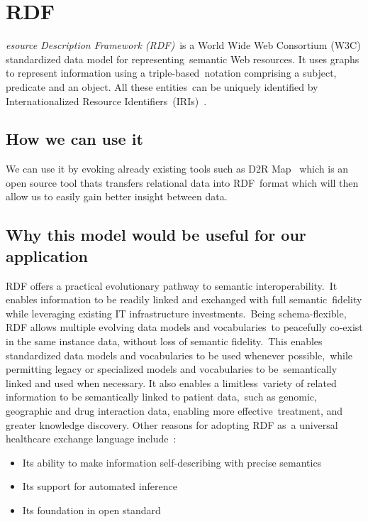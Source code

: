   \section[Resource Description Framework (RDF)]{RDF}
  \label{sec:rdf}

  \textit{esource Description Framework (RDF)}\
  is a World Wide Web Consortium (W3C) standardized data model for representing\
  semantic Web resources. It uses graphs to represent information using a triple-based\
  notation comprising a subject, predicate and an object. All these entities\
  can be uniquely identified by Internationalized Resource Identifiers\
  (IRIs)~\citep{pathak_applying_2012}.

  \subsection{How we can use it}

  We can use it by evoking already existing tools such as D2R Map \citep{_d2r_tool_2013}\
  which is an open source tool thats transfers relational data into RDF\
  format which will then allow us to easily gain better insight between data.\

  \subsection{Why this model would be useful for our application}

  RDF offers a practical evolutionary pathway to semantic interoperability.\
  It enables information to be readily linked and exchanged with full semantic\
  fidelity while leveraging existing IT infrastructure investments.\
  Being schema-flexible, RDF allows multiple evolving data models and vocabularies\
  to peacefully co-exist in the same instance data, without loss of semantic fidelity.\
  This enables standardized data models and vocabularies to be used whenever possible,\ 
  while permitting legacy or specialized models and vocabularies to be\
  semantically linked and used when necessary. It also enables a limitless\
  variety of related information to be semantically linked to patient data,\
  such as genomic, geographic and drug interaction data, enabling more effective\
  treatment, and greater knowledge discovery. Other reasons for adopting RDF as\
  a universal healthcare exchange language include~\citep{_Munnecke_2013}:
  \begin{itemize}
    \itemsep0ex
    \item Its ability to make information self-describing with precise semantics
    \item Its support for automated inference
    \item Its foundation in open standard
  \end{itemize}

